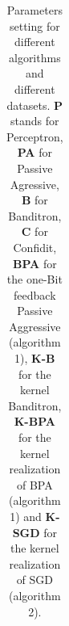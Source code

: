 \documentclass[preprint,12pt,authoryear]{elsarticle}
\begin{document}
\begin{table}[h]
	\caption{Parameters setting for different algorithms and different datasets.  {\bf P} stands for Perceptron, {\bf PA} for Passive Agressive, {\bf B} for Banditron, {\bf C} for Confidit, {\bf BPA} for the one-Bit feedback Passive Aggressive (algorithm 1), {\bf K-B} for the kernel Banditron, {\bf K-BPA}  for the kernel  realization of BPA (algorithm 1) and {\bf K-SGD} for the kernel  realization of SGD (algorithm 2).}
	\label{table:bpa}
	
	\begin{center}
		\begin{tabular}{llllll}
			

\end{tabular}
\end{center}
\end{table}
\end{document}
